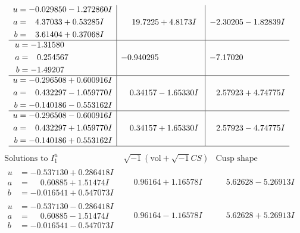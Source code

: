 \documentclass[1p]{elsarticle_modified}
\theoremstyle{definition}
\newcommand{\I}{\sqrt{-1}}
\begin{document}
$$\begin{array}{c|c|c}
\begin{aligned}
u &= -0.029850 - 1.272860 I \\
a &= \phantom{-}4.37033 + 0.53285 I \\
b &= \phantom{-}3.61404 + 0.37068 I\end{aligned}
 & \phantom{-}19.7225 + 4.8173 I & -2.30205 - 1.82839 I \\ \hline\begin{aligned}
u &= -1.31580\phantom{ +0.000000I} \\
a &= \phantom{-}0.254567\phantom{ +0.000000I} \\
b &= -1.49207\phantom{ +0.000000I}\end{aligned}
 & -0.940295\phantom{ +0.000000I} & -7.17020\phantom{ +0.000000I} \\ \hline\begin{aligned}
u &= -0.296508 + 0.600916 I \\
a &= \phantom{-}0.432297 - 1.059770 I \\
b &= -0.140186 - 0.553162 I\end{aligned}
 & \phantom{-}0.34157 - 1.65330 I & \phantom{-}2.57923 + 4.74775 I \\ \hline\begin{aligned}
u &= -0.296508 - 0.600916 I \\
a &= \phantom{-}0.432297 + 1.059770 I \\
b &= -0.140186 + 0.553162 I\end{aligned}
 & \phantom{-}0.34157 + 1.65330 I & \phantom{-}2.57923 - 4.74775 I\\
 \hline 
 \end{array}$$\newpage$$\begin{array}{c|c|c}  
\text{Solutions to }I^u_{1}& \I (\text{vol} + \sqrt{-1}CS) & \text{Cusp shape}\\
 \hline 
\begin{aligned}
u &= -0.537130 + 0.286418 I \\
a &= \phantom{-}0.60885 + 1.51474 I \\
b &= -0.016541 + 0.547073 I\end{aligned}
 & \phantom{-}0.96164 + 1.16578 I & \phantom{-}5.62628 - 5.26913 I \\ \hline\begin{aligned}
u &= -0.537130 - 0.286418 I \\
a &= \phantom{-}0.60885 - 1.51474 I \\
b &= -0.016541 - 0.547073 I\end{aligned}
 & \phantom{-}0.96164 - 1.16578 I & \phantom{-}5.62628 + 5.26913 I \\ \hline\begin{aligned}

\end{aligned}
\end{array}$$
\end{document}
